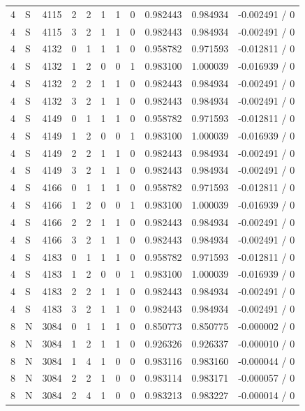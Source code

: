 \begin{longtable}{@{}rlrrlrrrrrr@{}}
4 & S & 4115 & 2 & 2 & 1 & 1 & 0 & 0.982443 & 0.984934 & -0.002491 / 0 \\
4 & S & 4115 & 3 & 2 & 1 & 1 & 0 & 0.982443 & 0.984934 & -0.002491 / 0 \\
4 & S & 4132 & 0 & 1 & 1 & 1 & 0 & 0.958782 & 0.971593 & -0.012811 / 0 \\
4 & S & 4132 & 1 & 2 & 0 & 0 & 1 & 0.983100 & 1.000039 & -0.016939 / 0 \\
4 & S & 4132 & 2 & 2 & 1 & 1 & 0 & 0.982443 & 0.984934 & -0.002491 / 0 \\
4 & S & 4132 & 3 & 2 & 1 & 1 & 0 & 0.982443 & 0.984934 & -0.002491 / 0 \\
4 & S & 4149 & 0 & 1 & 1 & 1 & 0 & 0.958782 & 0.971593 & -0.012811 / 0 \\
4 & S & 4149 & 1 & 2 & 0 & 0 & 1 & 0.983100 & 1.000039 & -0.016939 / 0 \\
4 & S & 4149 & 2 & 2 & 1 & 1 & 0 & 0.982443 & 0.984934 & -0.002491 / 0 \\
4 & S & 4149 & 3 & 2 & 1 & 1 & 0 & 0.982443 & 0.984934 & -0.002491 / 0 \\
4 & S & 4166 & 0 & 1 & 1 & 1 & 0 & 0.958782 & 0.971593 & -0.012811 / 0 \\
4 & S & 4166 & 1 & 2 & 0 & 0 & 1 & 0.983100 & 1.000039 & -0.016939 / 0 \\
4 & S & 4166 & 2 & 2 & 1 & 1 & 0 & 0.982443 & 0.984934 & -0.002491 / 0 \\
4 & S & 4166 & 3 & 2 & 1 & 1 & 0 & 0.982443 & 0.984934 & -0.002491 / 0 \\
4 & S & 4183 & 0 & 1 & 1 & 1 & 0 & 0.958782 & 0.971593 & -0.012811 / 0 \\
4 & S & 4183 & 1 & 2 & 0 & 0 & 1 & 0.983100 & 1.000039 & -0.016939 / 0 \\
4 & S & 4183 & 2 & 2 & 1 & 1 & 0 & 0.982443 & 0.984934 & -0.002491 / 0 \\
4 & S & 4183 & 3 & 2 & 1 & 1 & 0 & 0.982443 & 0.984934 & -0.002491 / 0 \\
8 & N & 3084 & 0 & 1 & 1 & 1 & 0 & 0.850773 & 0.850775 & -0.000002 / 0 \\
8 & N & 3084 & 1 & 2 & 1 & 1 & 0 & 0.926326 & 0.926337 & -0.000010 / 0 \\
8 & N & 3084 & 1 & 4 & 1 & 0 & 0 & 0.983116 & 0.983160 & -0.000044 / 0 \\
8 & N & 3084 & 2 & 2 & 1 & 0 & 0 & 0.983114 & 0.983171 & -0.000057 / 0 \\
8 & N & 3084 & 2 & 4 & 1 & 0 & 0 & 0.983213 & 0.983227 & -0.000014 / 0 \\

\end{longtable}
